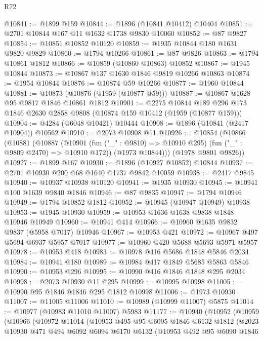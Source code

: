 \begin{lexlean}{R72}
\begin{coremodule}
@10841 := @1899 @159
@10844 := @1896 (@10841 @10412) @10404
@10851 := @2701 @10844 @167 @11 @1632 @1738 @9830 @10060
@10852 := @87 @9827
@10854 := @10851 @10852 @10120
@10859 := @1935 @10844 @180 @1631 @9820 @9829
@10860 := @1794 @10266
@10861 := @87 @9826
@10863 := @1794 @10861 @1812
@10866 := @10859 (@10860 @10863) @10852
@10867 := @1945 @10844
@10873 := @10867 @137 @1630 @1846 @9819 @10266 @10863
@10874 := @1954 @10844
@10876 := @10874 @59 @10266
@10877 := @1960 @10844
@10881 := @10873 (@10876 (@1959 (@10877 @59)))
@10887 := @10867 @1628 @95 @9817 @1846 @10861 @1812
@10901 := @2275
    @10844
    @189
    @296
    @173
    @1846
    @2630
    @2858
    @9808
    (@10874 @159 @10412 (@1959 (@10877 @159)))
@10904 := @4284 (@6048 @10421) @10444
@10908 := @1896 (@10841 (@2417 @10904)) @10562
@10910 := @2073 @10908 @11
@10926 := @10854
    (@10866
      (@10881
        (@10887
          (@10901 (fun ("_" : @9810) => @10910 @295) (fun ("_" : @9809 @2470) => @10910 @172))
          (@1973 @10844)))
      (@1978 @9801 @9826))
@10927 := @1899 @167
@10930 := @1896 (@10927 @10852) @10844
@10937 := @2701 @10930 @200 @68 @1640 @1737 @9842 @10059
@10938 := @2417 @9845
@10940 := @10937 @10938 @10120
@10941 := @1935 @10930
@10945 := @10941 @100 @1639 @9840 @1846
@10946 := @87 @9835
@10947 := @1794 @10946
@10949 := @1794 @10852 @1812
@10952 := @10945 (@10947 @10949) @10938
@10953 := @1945 @10930
@10959 := @10953 @1636 @1638 @9838 @1848 @10946 @10949
@10960 := @10941 @414
@10966 := @10960 @1635 @9832 @9837 (@5958 @7017) @10946
@10967 := @10953 @421
@10972 := @10967 @497 @5694 @6937 @5957 @7017
@10977 := @10960 @420 @5688 @5693 @5971 @5957
@10978 := @10953 @418
@10983 := @10978 @416 @5686 @1848 @5846 @2034
@10984 := @10941 @180
@10989 := @10984 @417 @1849 @5685 @5863 @5846
@10990 := @10953 @296
@10995 := @10990 @416 @1846 @1848 @295 @2034
@10998 := @2073 @10930 @11 @295
@10999 := @10995 @10998
@11005 := @10990 @95 @1846 @1846 @295 @1812 @10998
@11006 := @1973 @10930
@11007 := @11005 @11006
@11010 := @10989 (@10999 @11007) @5875
@11014 := @10977 (@10983 @11010 @11007) @5983
@11177 := @10940
    (@10952
      (@10959
        (@10966
          (@10972
            @11014
            (@10953
              @495
              @95
              @6095
              @1846
              @6132
              @1812
              (@2023
                @10930
                @471
                @494
                @6092
                @6094
                @6170
                @6132
                (@10953
                  @492
                  @95
                  @6090
                  @1846

\end{coremodule}
\end{lexlean}
